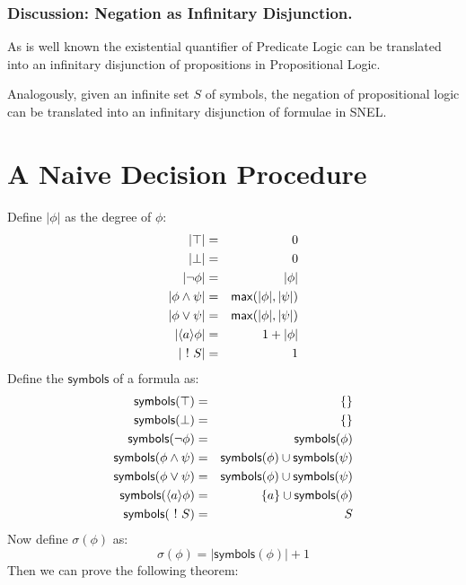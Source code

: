 \subsubsection{Discussion: Negation as Infinitary Disjunction. }
As is well known the existential quantifier of Predicate Logic can be translated into an infinitary disjunction of propositions in Propositional Logic.

Analogously, given an infinite set $S$ of symbols, the
negation of propositional logic can be translated into an infinitary
disjunction of formulae in SNEL.



\section{A Naive Decision Procedure}
Define $|\phi|$ as the degree of $\phi$:
\begin{eqnarray*}
|\top| & = & 0  \\
|\bot| & = & 0  \\
|\neg \phi| & = & | \phi |  \\
|\phi \land \psi| & = & \mathsf{max}(| \phi |, | \psi|)  \\
|\phi \lor \psi| & = & \mathsf{max}(| \phi |, | \psi|)  \\
|\langle a \rangle \phi | & = & 1 + | \phi |  \\
| \ ! \  S | & = & 1 
\end{eqnarray*}
Define the $\mathsf{symbols}$ of a formula as:
\begin{eqnarray*}
\mathsf{symbols}(\top) & = & \{\}  \\
\mathsf{symbols}(\bot) & = & \{\}  \\
\mathsf{symbols}(\neg \phi) & = & \mathsf{symbols}(\phi)  \\
\mathsf{symbols}(\phi \land \psi) & = &\mathsf{symbols}(\phi) \cup \mathsf{symbols}(\psi)  \\
\mathsf{symbols}(\phi \lor \psi) & = &\mathsf{symbols}(\phi) \cup \mathsf{symbols}(\psi)  \\
\mathsf{symbols}(\langle a \rangle \phi) & = & \{a\} \cup \mathsf{symbols}(\phi)  \\
\mathsf{symbols}(\ ! \  S) & = & S 
\end{eqnarray*}
Now define $\sigma(\phi)$ as:
\[
\sigma(\phi) = |\mathsf{symbols}(\phi)| + 1
\]
Then we can prove the following theorem:

